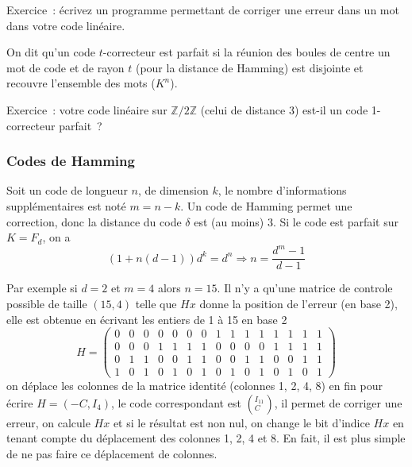 \documentclass[a4paper,11pt]{article}
\newcommand{\Z}{{\mathbb{Z}}}
\begin{document}
\begin{giacjshere}
Exercice~: écrivez un programme permettant de corriger une erreur
dans un mot dans votre code linéaire.

On dit qu'un code $t$-correcteur est parfait si la réunion des boules
de centre un mot de code et de rayon $t$ (pour la distance de Hamming)
est disjointe et recouvre l'ensemble des mots ($K^n$).

Exercice~: votre code linéaire sur $\Z/2\Z$ (celui de distance 3) 
est-il un code 1-correcteur parfait~?

\subsubsection{Codes de Hamming}
Soit un code de longueur $n$, de dimension $k$, le nombre
d'informations suppl\'ementaires est not\'e $m=n-k$. Un code
de Hamming permet une correction, donc la distance du code
$\delta$ est (au moins) 3. Si le code est parfait sur $K=F_d$, on a 
$$ (1+n(d-1))d^k=d^{n} \Rightarrow n=\frac{d^m-1}{d-1}$$

Par exemple si $d=2$ et $m=4$ alors $n=15$. 
Il n'y a qu'une matrice de controle possible de taille
$(15,4)$ telle que $Hx$ donne la position de l'erreur (en base 2),
elle est obtenue en \'ecrivant les entiers de 1 \`a 15 en base 2
$$ H=\left( \begin{array}{ccccccccccccccc}
0 & 0 & 0 & 0 & 0 & 0 & 0 & 1 & 1 & 1 & 1 & 1 & 1 & 1 & 1 \\
0 & 0 & 0 & 1 & 1 & 1 & 1 & 0 & 0 & 0 & 0 & 1 & 1 & 1 & 1 \\
0 & 1 & 1 & 0 & 0 & 1 & 1 & 0 & 0 & 1 & 1 & 0 & 0 & 1 & 1 \\
1 & 0 & 1 & 0 & 1 & 0 & 1 & 0 & 1 & 0 & 1 & 0 & 1 & 0 & 1
 \end{array} \right)$$
on d\'eplace les colonnes de la matrice identit\'e 
(colonnes 1, 2, 4, 8)
en fin pour \'ecrire $H=(-C,I_4)$, le code correspondant est
$\left( ^{I_{11}} _C \right)$, il permet de corriger une erreur,
on calcule $Hx$ et si le r\'esultat est non nul, on change le
bit d'indice $Hx$ en tenant compte du d\'eplacement des colonnes
1, 2, 4 et 8. En fait, il est plus simple de ne pas faire ce
d\'eplacement de colonnes.


\end{giacjshere}
\end{document}
